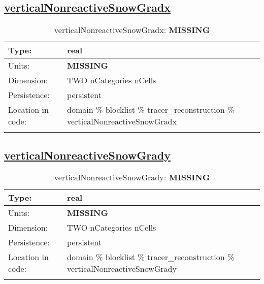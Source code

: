 \subsection[verticalNonreactiveSnowGradx]{\hyperref[sec:var_tab_tracer_reconstruction]{verticalNonreactiveSnowGradx}}
\label{subsec:var_sec_tracer_reconstruction_verticalNonreactiveSnowGradx}
\begin{center}
\begin{longtable}{| p{2.0in} | p{4.0in} |}
        \hline 
        Type: & real \\
        \hline 
        Units: & {\bf \color{red} MISSING} \\
        \hline 
        Dimension: & TWO nCategories nCells \\
        \hline 
        Persistence: & persistent \\
        \hline 
         Location in code: & domain \% blocklist \% tracer\_reconstruction \% verticalNonreactiveSnowGradx \\
         \hline 
    \caption{verticalNonreactiveSnowGradx: {\bf \color{red} MISSING}}
\end{longtable}
\end{center}
\subsection[verticalNonreactiveSnowGrady]{\hyperref[sec:var_tab_tracer_reconstruction]{verticalNonreactiveSnowGrady}}
\label{subsec:var_sec_tracer_reconstruction_verticalNonreactiveSnowGrady}
\begin{center}
\begin{longtable}{| p{2.0in} | p{4.0in} |}
        \hline 
        Type: & real \\
        \hline 
        Units: & {\bf \color{red} MISSING} \\
        \hline 
        Dimension: & TWO nCategories nCells \\
        \hline 
        Persistence: & persistent \\
        \hline 
         Location in code: & domain \% blocklist \% tracer\_reconstruction \% verticalNonreactiveSnowGrady \\
         \hline 
    \caption{verticalNonreactiveSnowGrady: {\bf \color{red} MISSING}}
\end{longtable}
\end{center}
